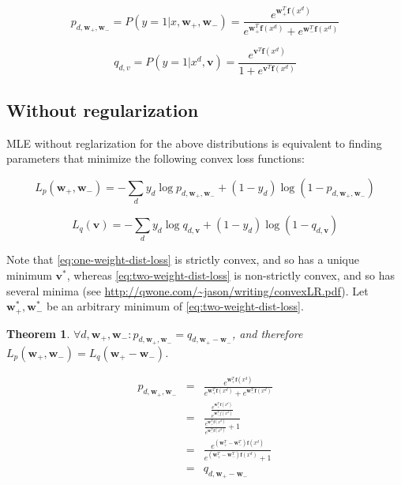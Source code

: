 \documentclass[11pt,letterpaper]{article}
\newtheorem{theorem}{Theorem}[section]
\begin{document}
\begin{equation}
\label{eq:two-weight-dist}
p_{d,\mathbf{w}_+,\mathbf{w}_-}=P(y=1|x,\mathbf{w}_+,\mathbf{w}_-)=\frac{e^{\mathbf{w}_+^T \mathbf{f}(x^d)}}{e^{\mathbf{w}_+^T \mathbf{f}(x^d)}+e^{\mathbf{w}_-^T \mathbf{f}(x^d)}}
\end{equation}

\begin{equation}
\label{eq:one-weight-dist}
q_{d,v}=P(y=1|x^d,\mathbf{v})=\frac{e^{\mathbf{v}^T \mathbf{f}(x^d)}}{1+e^{\mathbf{v}^T \mathbf{f}(x^d)}}
\end{equation}

\subsection{Without regularization}

MLE without reglarization for the above distributions 
is equivalent to finding parameters
that minimize the following convex loss functions:

\begin{equation}
\label{eq:two-weight-dist-loss}
L_p(\mathbf{w}_+,\mathbf{w}_-)=- \sum_d y_d\log p_{d,\mathbf{w}_+,\mathbf{w}_-} + (1-y_d)\log (1-p_{d,\mathbf{w}_+,\mathbf{w}_-})
\end{equation}

\begin{equation}
\label{eq:one-weight-dist-loss}
L_q(\mathbf{v})=- \sum_d y_d\log q_{d,\mathbf{v}} + (1-y_d)\log (1-q_{d,\mathbf{v}})
\end{equation}

Note that \ref{eq:one-weight-dist-loss} is strictly convex, and 
so has a unique minimum $\mathbf{v}^*$, whereas \ref{eq:two-weight-dist-loss}
is non-strictly convex, and so has several minima (see
 \url{http://qwone.com/~jason/writing/convexLR.pdf}).  Let 
$\mathbf{w}_+^*,\mathbf{w}_-^*$ be an arbitrary minimum of \ref{eq:two-weight-dist-loss}.

\begin{theorem}
$\forall d,\mathbf{w}_+,\mathbf{w}_-: p_{d,\mathbf{w}_+,\mathbf{w}_-}=q_{d,\mathbf{w}_+-\mathbf{w}_-}$, and 
therefore $L_p(\mathbf{w}_+,\mathbf{w}_-)=L_q(\mathbf{w}_+-\mathbf{w}_-)$.
\end{theorem}

\begin{eqnarray}
p_{d,\mathbf{w}_+,\mathbf{w}_-} & = & \frac{e^{\mathbf{w}_+^T \mathbf{f}(x^d)}}{e^{\mathbf{w}_+^T \mathbf{f}(x^d)}+e^{\mathbf{w}_-^T \mathbf{f}(x^d)}} \\
              & = & \frac{\frac{e^{\mathbf{w}_+^T \mathbf{f}(x^d)}}{e^{\mathbf{w}_-^T f(x^d)}}}{\frac{e^{\mathbf{w}_+^T \mathbf{f}(x^d)}}{e^{\mathbf{w}_-^T \mathbf{f}(x^d)}}+1} \\
              & = & \frac{e^{(\mathbf{w}_+^T-\mathbf{w}_-^T)\mathbf{f}(x^d)}}{e^{(\mathbf{w}_+^T-\mathbf{w}_-^T)\mathbf{f}(x^d)}+1} \\
              & = & q_{d,\mathbf{w}_+-\mathbf{w}_-}
\end{eqnarray}
\end{document}
